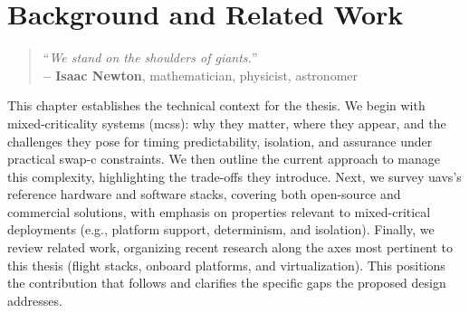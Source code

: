 %
\chapter{Background and Related Work}%
\label{ch:state-art}
%
\begin{quote}
\begin{flushright}
``\emph{We stand on the shoulders of giants.}'' \\
\textbf{-- Isaac Newton}, mathematician, physicist, astronomer
\end{flushright}
\end{quote}

This chapter establishes the technical context for the thesis. We begin with mixed-criticality systems (\glspl{mcs}): why they matter, where they appear, and the challenges they pose for timing predictability, isolation, and assurance under practical \gls{swap-c} constraints. We then outline the current approach to manage this complexity, highlighting the trade-offs they introduce.
%
Next, we survey \glspl{uav}'s reference hardware and software
stacks, covering both open-source and commercial solutions, with emphasis on
properties relevant to mixed-critical deployments (e.g., platform support,
determinism, and isolation).
%
Finally, we review related work, organizing recent research along the axes most
pertinent to this thesis (flight stacks, onboard platforms, and
virtualization). This positions the contribution that follows and clarifies the
specific gaps the proposed design addresses.



